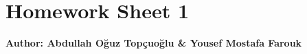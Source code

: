 \documentclass{article}
\begin{document}
\section*{\huge Homework Sheet 1}
\begin{flushright}
   \textbf{Author: Abdullah Oğuz Topçuoğlu \& Yousef Mostafa Farouk}
\end{flushright}

%
% 
% 
% 
% 
% 
%
\end{document}
